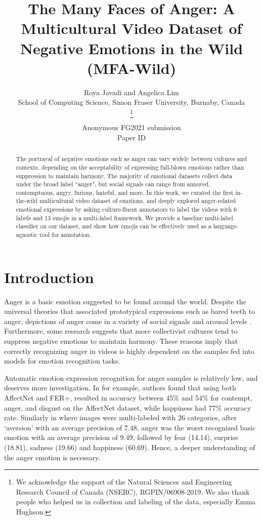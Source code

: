 \documentclass[letterpaper, 10 pt, conference]{ieeeconf}  \usepackage{FG2021}
\title{\LARGE \bf
The Many Faces of Anger: A Multicultural Video Dataset of Negative Emotions in the Wild (MFA-Wild)
}
\author{\parbox{16cm}{\centering
    {\large Roya Javadi and Angelica Lim}\\
    {\normalsize
    School of Computing Science, Simon Fraser University, Burnaby, Canada}}
    \thanks{We acknowledge the support of the Natural Sciences and Engineering Research Council of Canada (NSERC), RGPIN/06908-2019. We also thank people who helped us in collection and labeling of the data, especially Emma Hughson.}}
\begin{document}
\ifFGfinal
\thispagestyle{empty}
\pagestyle{empty}
\else
\author{Anonymous FG2021 submission\\ Paper ID \FGPaperID \\}
\pagestyle{plain}
\fi
\maketitle



\begin{abstract}

The portrayal of negative emotions such as anger can vary widely between cultures and contexts, depending on the acceptability of expressing full-blown emotions rather than suppression to maintain harmony. The majority of emotional datasets collect data under the broad label ``anger", but social signals can range from annoyed, contemptuous, angry, furious, hateful, and more. In this work, we curated the first in-the-wild multicultural video dataset of emotions, and deeply explored anger-related emotional expressions by asking culture-fluent annotators to label the videos with 6 labels and 13 emojis in a multi-label framework. We provide a baseline multi-label classifier on our dataset, and show how emojis can be effectively used as a language-agnostic tool for annotation.



\end{abstract}


\section{Introduction}

Anger is a basic emotion suggested to be found around the world. Despite the universal theories that associated prototypical expressions such as bared teeth to anger, depictions of anger come in a variety of social signals and arousal levels \cite{cite1}.  Furthermore, some research \cite{cite2, cite3, cite4} suggests that more collectivist cultures tend to suppress negative emotions to maintain harmony. These reasons imply that correctly recognizing anger in videos is highly dependent on the samples fed into models for emotion recognition tasks. 

Automatic emotion expression recognition for anger samples is relatively low, and deserves more investigation. In \cite{siqueira2020efficient} for example, authors found that using both AffectNet and FER+, resulted in accuracy between 45\% and 54\% for contempt, anger, and disgust on the AffectNet dataset, while happiness had 77\% accuracy rate. Similarly in \cite{Kosti_2019} where images were multi-labeled with 26 categories, after `aversion' with an average precision of 7.48, anger was the worst recognized basic emotion with an average precision of 9.49, followed by fear (14.14), surprise (18.81), sadness (19.66) and happiness (60.69). Hence, a deeper understanding of the anger emotion is necessary.
\end{document}
